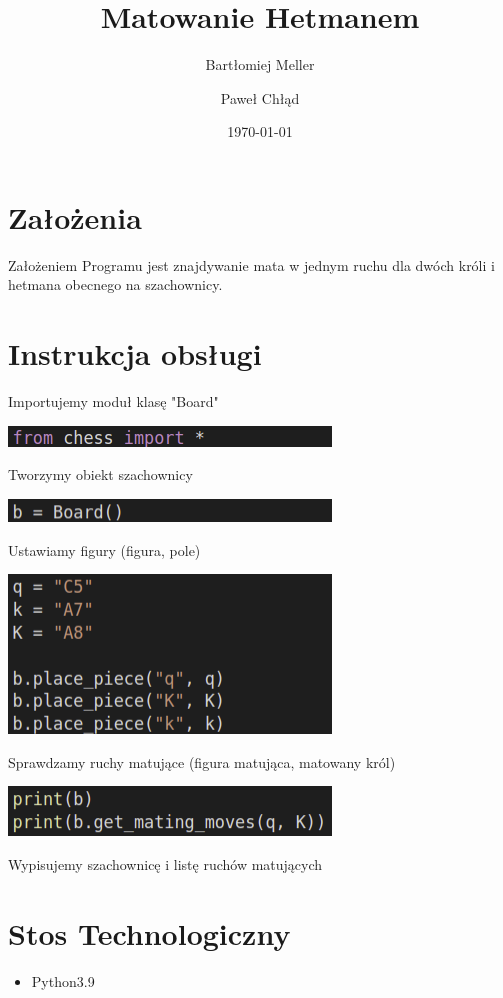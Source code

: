 \documentclass{article}
\title{Matowanie Hetmanem}
\author{Bartłomiej Meller\and Paweł Chłąd}
\date{\today}
\begin{document}
\maketitle


\section{Założenia}
Założeniem Programu jest znajdywanie mata w jednym ruchu dla dwóch króli i hetmana obecnego na szachownicy.


\section{Instrukcja obsługi}

Importujemy moduł klasę "Board"

\begin{center}
    \includegraphics{1}
\end{center}

Tworzymy obiekt szachownicy

\begin{center}
    \includegraphics{2}
\end{center}


Ustawiamy figury (figura, pole)

\begin{center}
    \includegraphics{3}
\end{center}


Sprawdzamy ruchy matujące (figura matująca, matowany król)

\begin{center}
    \includegraphics{4}
\end{center}


Wypisujemy szachownicę i listę ruchów matujących

\section{Stos Technologiczny}

\begin{itemize}

\item{Python3.9}

\end{itemize}
\end{document}
